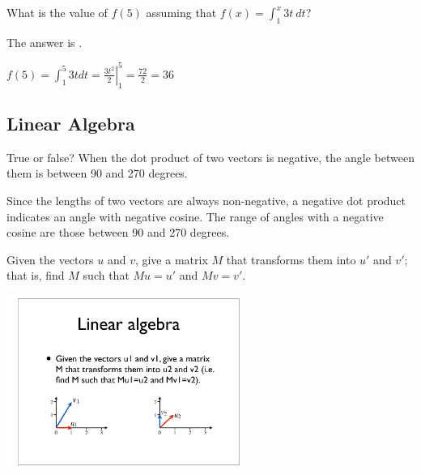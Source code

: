 \begin{question}
What is the value of $f(5) $ assuming that $f(x) = \int_1^x 3t ~dt$?
\begin{solution}
The answer is .
\end{solution}
$f(5) = \int_1^5 3t dt = \left. \frac{3t^2}{2} \right|_1^5 = \frac{72}{2} = 36$
\end{question}

\subsection*{Linear Algebra}

\begin{question}
True or false?  When the dot product of two vectors is negative, the angle between them is between 90 and 270 degrees.
\begin{solution}
\begin{multiple-choice}
\end{multiple-choice}
\end{solution}
Since the lengths of two vectors are always non-negative, a negative dot product indicates an angle with negative cosine. The range of angles with a negative cosine are those between 90 and 270 degrees.
\end{question}

\begin{question}
Given the vectors $u$ and $v$, give a matrix $M$ that transforms them
into $u'$ and $v'$; that is, find $M$ such that $M u=u'$ and $M v=v'$.
\begin{image}
\includegraphics[width=0.6\textwidth]{fig.pdf}
\end{image}
\end{question}



